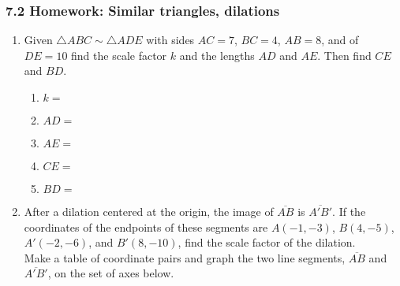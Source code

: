 \documentclass[12pt, twoside]{article}
\begin{document}
\subsubsection*{7.2 Homework: Similar triangles, dilations}
  \begin{enumerate}

    \item Given $\triangle ABC \sim \triangle ADE$ with sides $AC = 7$, $BC = 4$, $AB = 8$, and of $DE = 10$ find the scale factor $k$ and the lengths $AD$ and $AE$. Then find $CE$ and $BD$. %
    \begin{multicols}{2}
      \begin{enumerate}
        \item $k=$ \vspace{0.3cm}
        \item $AD=$ \vspace{0.3cm}
        \item $AE=$ \vspace{0.3cm}
        \item $CE=$
        \item $BD=$
      \end{enumerate}
      \begin{flushright}
      \end{flushright} 
    \end{multicols}%

  \item After a dilation centered at the origin, the image of $\overline{AB}$ is $\overline{A'B'}$. If the coordinates of the endpoints of these segments are $A(-1,-3)$, $B(4,-5)$, $A'(-2,-6)$, and $B'(8,-10)$, find the scale factor of the dilation.\\[0.25cm]
  Make a table of coordinate pairs and graph the two line segments,  $\overline{AB}$ and  $\overline{A'B'}$, on the set of axes below.
    \begin{flushright}
    \end{flushright}




\end{enumerate}
\end{document}
